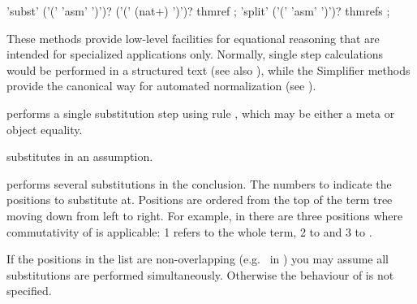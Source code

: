 \begin{isabellebody}
\begin{isamarkuptext}
  \begin{rail}
    'subst' ('(' 'asm' ')')? ('(' (nat+) ')')? thmref
    ;
    'split' ('(' 'asm' ')')? thmrefs
    ;
  \end{rail}

  These methods provide low-level facilities for equational reasoning
  that are intended for specialized applications only.  Normally,
  single step calculations would be performed in a structured text
  (see also ), while the Simplifier methods
  provide the canonical way for automated normalization (see
  ).

  \begin{descr}

  \item [\mbox{\isa{subst}}~\isa{eq}] performs a single substitution
  step using rule , which may be either a meta or object
  equality.

  \item [\mbox{\isa{subst}}~\isa{{\isachardoublequote}{\isacharparenleft}asm{\isacharparenright}\ eq{\isachardoublequote}}] substitutes in an
  assumption.

  \item [\mbox{\isa{subst}}~\isa{{\isachardoublequote}{\isacharparenleft}i\ {\isasymdots}\ j{\isacharparenright}\ eq{\isachardoublequote}}] performs several
  substitutions in the conclusion. The numbers  to 
  indicate the positions to substitute at.  Positions are ordered from
  the top of the term tree moving down from left to right. For
  example, in  there are three positions
  where commutativity of \isa{{\isachardoublequote}{\isacharplus}{\isachardoublequote}} is applicable: 1 refers to the
  whole term, 2 to  and 3 to .

  If the positions in the list  are non-overlapping
  (e.g.\  in ) you may
  assume all substitutions are performed simultaneously.  Otherwise
  the behaviour of  is not specified.


\end{descr}
\end{isamarkuptext}
\end{isabellebody}
